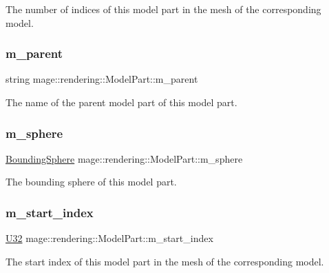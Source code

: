 The number of indices of this model part in the mesh of the corresponding model. \hypertarget{structmage_1_1rendering_1_1_model_part_a906ce278d6911d1163c8ce3a521c6598}{}\label{structmage_1_1rendering_1_1_model_part_a906ce278d6911d1163c8ce3a521c6598} 
\subsubsection{\texorpdfstring{m\+\_\+parent}{m\_parent}}
{\footnotesize\ttfamily string mage\+::rendering\+::\+Model\+Part\+::m\+\_\+parent}

The name of the parent model part of this model part. \hypertarget{structmage_1_1rendering_1_1_model_part_aa2204e02fe90f993990cdda677bff6e7}{}\label{structmage_1_1rendering_1_1_model_part_aa2204e02fe90f993990cdda677bff6e7} 
\subsubsection{\texorpdfstring{m\+\_\+sphere}{m\_sphere}}
{\footnotesize\ttfamily \hyperlink{classmage_1_1_bounding_sphere}{Bounding\+Sphere} mage\+::rendering\+::\+Model\+Part\+::m\+\_\+sphere}

The bounding sphere of this model part. \hypertarget{structmage_1_1rendering_1_1_model_part_a251d19417a0b4abe98faeae767b9fef4}{}\label{structmage_1_1rendering_1_1_model_part_a251d19417a0b4abe98faeae767b9fef4} 
\subsubsection{\texorpdfstring{m\+\_\+start\+\_\+index}{m\_start\_index}}
{\footnotesize\ttfamily \hyperlink{namespacemage_a41c104c036fba3756a74e19f793eeaa1}{U32} mage\+::rendering\+::\+Model\+Part\+::m\+\_\+start\+\_\+index}

The start index of this model part in the mesh of the corresponding model. \hypertarget{structmage_1_1rendering_1_1_model_part_af34853cb09b179bd8ffb0da151914066}{}\label{structmage_1_1rendering_1_1_model_part_af34853cb09b179bd8ffb0da151914066} 
